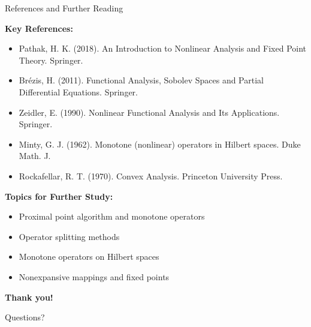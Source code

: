 \documentclass[aspectratio=169,10pt]{beamer}
\begin{document}
\begin{frame}{References and Further Reading}

\textbf{Key References:}

\begin{itemize}
\item Pathak, H. K. (2018). An Introduction to Nonlinear Analysis and Fixed Point Theory. Springer.

\item Brézis, H. (2011). Functional Analysis, Sobolev Spaces and Partial Differential Equations. Springer.

\item Zeidler, E. (1990). Nonlinear Functional Analysis and Its Applications. Springer.

\item Minty, G. J. (1962). Monotone (nonlinear) operators in Hilbert spaces. Duke Math. J.

\item Rockafellar, R. T. (1970). Convex Analysis. Princeton University Press.
\end{itemize}

\vspace{0.3cm}

\textbf{Topics for Further Study:}
\begin{itemize}
\item Proximal point algorithm and monotone operators
\item Operator splitting methods
\item Monotone operators on Hilbert spaces
\item Nonexpansive mappings and fixed points
\end{itemize}

\end{frame}

\begin{frame}
\centering
\huge\textbf{Thank you!}

\vspace{1cm}

\Large Questions?
\end{frame}
\end{document}
